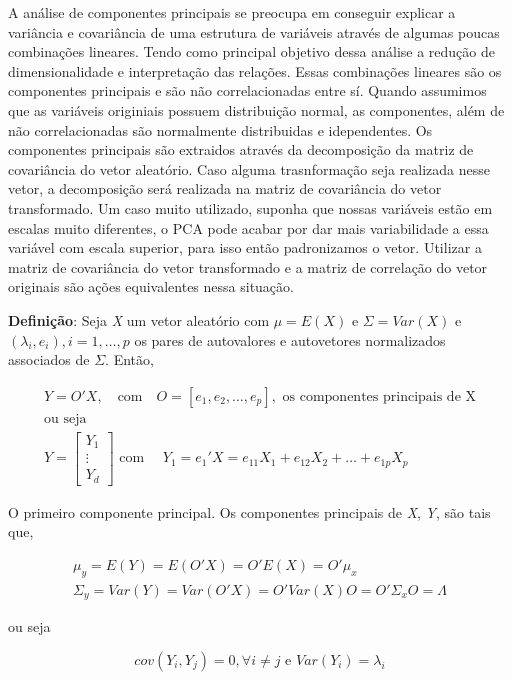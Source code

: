 \documentclass[
  letterpaper,
  DIV=11,
  numbers=noendperiod]{scrreprt}
\begin{document}
A análise de componentes principais se preocupa em conseguir explicar a
variância e covariância de uma estrutura de variáveis através de algumas
poucas combinações lineares. Tendo como principal objetivo dessa análise
a redução de dimensionalidade e interpretação das relações. Essas
combinações lineares são os componentes principais e são não
correlacionadas entre sí. Quando assumimos que as variáveis originiais
possuem distribuição normal, as componentes, além de não correlacionadas
são normalmente distribuidas e idependentes. Os componentes principais
são extraidos através da decomposição da matriz de covariância do vetor
aleatório. Caso alguma trasnformação seja realizada nesse vetor, a
decomposição será realizada na matriz de covariância do vetor
transformado. Um caso muito utilizado, suponha que nossas variáveis
estão em escalas muito diferentes, o PCA pode acabar por dar mais
variabilidade a essa variável com escala superior, para isso então
padronizamos o vetor. Utilizar a matriz de covariância do vetor
transformado e a matriz de correlação do vetor originais são ações
equivalentes nessa situação.

\textbf{Definição}: Seja \emph{X} um vetor aleatório com \(\mu = E(X)\)
e \(\Sigma = Var(X)\) e \((\lambda_i,e_i), i = 1,\dots,p\) os pares de
autovalores e autovetores normalizados associados de \(\Sigma\). Então,

\[
\begin{split}
Y = O'X,\quad \textrm{com}\quad O = [e_1,e_2,\dots,e_p],\textrm{ os componentes principais de X}\\
\textrm{ou seja}\\
Y = 
\begin{bmatrix}
Y_1\\
\vdots\\
Y_d
\end{bmatrix} \textrm{ com  } \quad Y_1 = e_1'X = e_{11}X_1 + e_{12}X_2 +  \dots + e_{1p}X_p 
\end{split}
\]

O primeiro componente principal. Os componentes principais de \emph{X},
\emph{Y}, são tais que,

\[
\begin{split}
\mu_y = E(Y) = E(O'X) = O'E(X) = O'\mu_x\\
\Sigma_y = Var(Y) = Var(O'X) = O'Var(X)O = O'\Sigma_xO = \Lambda
\end{split}
\]

ou seja

\[
cov(Y_i,Y_j) = 0, \forall i \neq j \textrm{ e } Var(Y_i) = \lambda_i
\]
\end{document}

